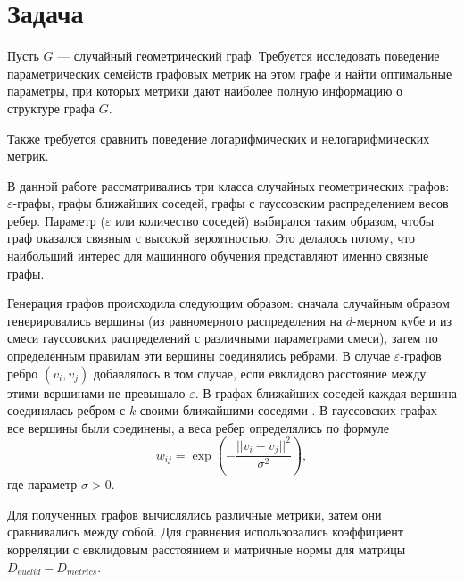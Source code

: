 \section{Задача} \label{sect1_2}

Пусть $G$ --- случайный геометрический граф. Требуется исследовать поведение параметрических семейств графовых метрик на этом графе и найти оптимальные параметры, при которых метрики дают наиболее полную информацию о структуре графа $G$.

Также требуется сравнить поведение логарифмических и нелогарифмических метрик.

В данной работе рассматривались три класса случайных геометрических графов: $\varepsilon$-графы, графы ближайших соседей, графы с гауссовским распределением весов ребер. Параметр ($\varepsilon$ или количество соседей) выбирался таким образом, чтобы граф оказался связным с высокой вероятностью. Это делалось потому, что наибольший интерес для машинного обучения представляют именно связные графы.

Генерация графов происходила следующим образом: сначала случайным образом генерировались вершины (из равномерного распределения на $d$-мерном кубе и из смеси гауссовских распределений с различными параметрами смеси), затем по определенным правилам эти вершины соединялись ребрами. В случае $\varepsilon$-графов ребро $(v_i, v_j)$ добавлялось в том случае, если евклидово расстояние между этими вершинами не превышало $\varepsilon$. В графах ближайших соседей каждая вершина соединялась ребром с $k$ своими ближайшими соседями . В гауссовских графах все вершины были соединены, а веса ребер определялись по формуле 
\begin{equation}
w_{ij} = \exp(-\frac{||v_i - v_j||^2} {\sigma^2} ),
\end{equation}
где параметр $\sigma > 0.$

Для полученных графов вычислялись различные метрики, затем они сравнивались между собой. Для сравнения использовались коэффициент корреляции с евклидовым расстоянием и матричные нормы для матрицы $D_{euclid} - D_{metrics}$.







